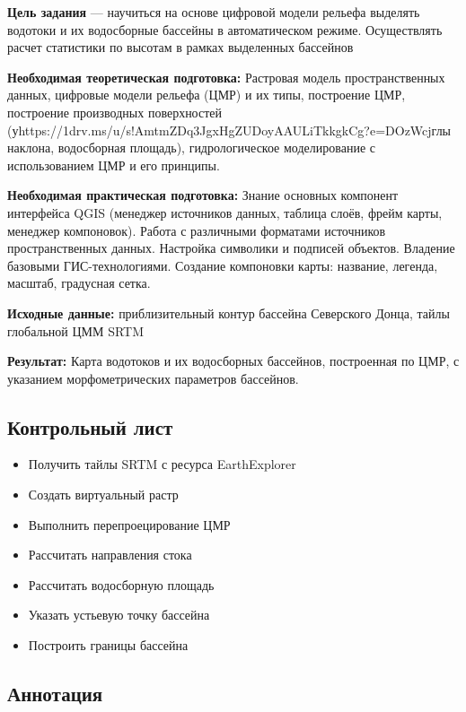 \documentclass[
  12pt,
]{book}
\begin{document}
\textbf{Цель задания} --- научиться на основе цифровой модели рельефа выделять водотоки и их водосборные бассейны в автоматическом режиме. Осуществлять расчет статистики по высотам в рамках выделенных бассейнов

\textbf{Необходимая теоретическая подготовка:} Растровая модель пространственных данных, цифровые модели рельефа (ЦМР) и их типы, построение ЦМР, построение производных поверхностей (уhttps://1drv.ms/u/s!AmtmZDq3JgxHgZUDoyAAULiTkkgkCg?e=DOzWcjглы наклона, водосборная площадь), гидрологическое моделирование с использованием ЦМР и его принципы.

\textbf{Необходимая практическая подготовка:} Знание основных компонент интерфейса QGIS (менеджер источников данных, таблица слоёв, фрейм карты, менеджер компоновок). Работа с различными форматами источников пространственных данных. Настройка символики и подписей объектов. Владение базовыми ГИС-технологиями. Создание компоновки карты: название, легенда, масштаб, градусная сетка.

\textbf{Исходные данные:} приблизительный контур бассейна Северского Донца, тайлы глобальной ЦММ SRTM

\textbf{Результат:} Карта водотоков и их водосборных бассейнов, построенная по ЦМР, с указанием морфометрических параметров бассейнов.

\hypertarget{hydrodem-control}{%
\subsection{Контрольный лист}\label{hydrodem-control}}

\begin{itemize}
\item
  Получить тайлы SRTM с ресурса EarthExplorer
\item
  Создать виртуальный растр
\item
  Выполнить перепроецирование ЦМР
\item
  Рассчитать направления стока
\item
  Рассчитать водосборную площадь
\item
  Указать устьевую точку бассейна
\item
  Построить границы бассейна
\end{itemize}

\hypertarget{hydrodem-annotation}{%
\subsection{Аннотация}\label{hydrodem-annotation}}
\end{document}

